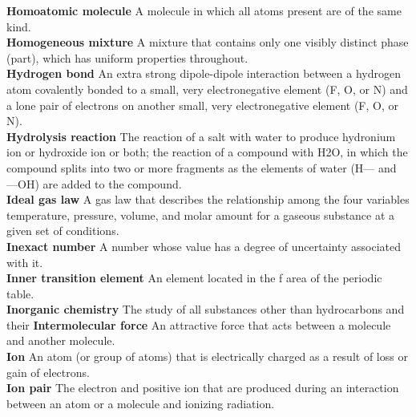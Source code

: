 \documentclass[10pt, roman]{article}
\begin{document}
\noindent \begin{minipage}[c]{0.30\textwidth}
\textbf{Homoatomic molecule} A molecule in which all atoms present are of the same kind. \\
\textbf{Homogeneous mixture} A mixture that contains only one visibly distinct phase (part), which has uniform properties throughout. \\
\textbf{Hydrogen bond} An extra strong dipole-dipole interaction between a hydrogen atom covalently bonded to a small, very electronegative element (F, O, or N) and a lone pair of electrons on another small, very electronegative element (F, O, or N). \\
\textbf{Hydrolysis reaction} The reaction of a salt with water to produce hydronium ion or hydroxide ion or both; the reaction of a compound with H2O, in which the compound splits into two or more fragments as the elements of water (H— and —OH) are added to the compound. \\
\textbf{Ideal gas law} A gas law that describes the relationship among the four variables temperature, pressure, volume, and molar amount for a gaseous substance at a given set of conditions. \\
\textbf{Inexact number} A number whose value has a degree of uncertainty associated with it. \\
\textbf{Inner transition element} An element located in the f area of the periodic table. \\
\textbf{Inorganic chemistry} The study of all substances other than hydrocarbons and their
\textbf{Intermolecular force} An attractive force that acts between a molecule and another molecule. \\
\textbf{Ion} An atom (or group of atoms) that is electrically charged as a result of loss or gain of electrons. \\
\textbf{Ion pair} The electron and positive ion that are produced during an interaction between an atom or a molecule and ionizing radiation. \\
\end{minipage}%
\hfill
\end{document}
